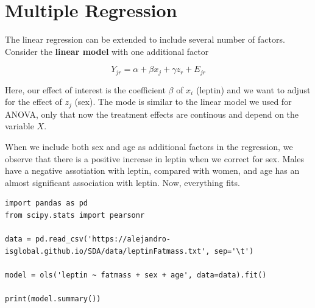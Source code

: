 \documentclass[
]{book}
\begin{document}
\hypertarget{multiple-regression}{%
\section{Multiple Regression}\label{multiple-regression}}

The linear regression can be extended to include several number of factors. Consider the \textbf{linear model} with one additional factor

\[Y_{jr} = \alpha + \beta x_j +\gamma z_{r}+E_{jr}\]

Here, our effect of interest is the coefficient \(\beta\) of \(x_i\) (leptin) and we want to adjust for the effect of \(z_j\) (sex). The mode is similar to the linear model we used for ANOVA, only that now the treatment effects are continous and depend on the variable \(X\).

When we include both sex and age as additional factors in the regression, we observe that there is a positive increase in leptin when we correct for sex. Males have a negative assotiation with leptin, compared with women, and age has an almost significant association with leptin. Now, everything fits.

\begin{verbatim}
import pandas as pd
from scipy.stats import pearsonr

data = pd.read_csv('https://alejandro-isglobal.github.io/SDA/data/leptinFatmass.txt', sep='\t')

model = ols('leptin ~ fatmass + sex + age', data=data).fit()

print(model.summary())
\end{verbatim}
\end{document}
